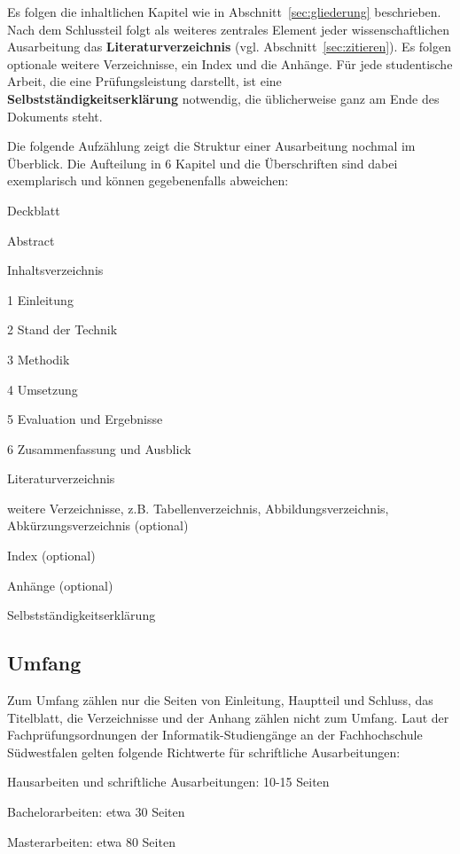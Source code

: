 Es folgen die inhaltlichen Kapitel wie in Abschnitt~\ref{sec:gliederung} beschrieben.
Nach dem Schlussteil folgt als weiteres zentrales Element jeder wissenschaftlichen Ausarbeitung das \textbf{Literaturverzeichnis} (vgl. Abschnitt~\ref{sec:zitieren}).
Es folgen optionale weitere Verzeichnisse, ein Index und die Anhänge.
Für jede studentische Arbeit, die eine Prüfungsleistung darstellt, ist eine \textbf{Selbstständigkeitserklärung} notwendig, die üblicherweise ganz am Ende des Dokuments steht.

Die folgende Aufzählung zeigt die Struktur einer Ausarbeitung nochmal im Überblick.
Die Aufteilung in 6 Kapitel und die Überschriften sind dabei exemplarisch und können gegebenenfalls abweichen:
\begin{compactitem}
\item Deckblatt
\item Abstract
\item Inhaltsverzeichnis
\item[1] Einleitung
\item[2] Stand der Technik
\item[3] Methodik
\item[4] Umsetzung
\item[5] Evaluation und Ergebnisse
\item[6] Zusammenfassung und Ausblick
\item Literaturverzeichnis
\item weitere Verzeichnisse, z.B. Tabellenverzeichnis, Abbildungsverzeichnis, Abkürzungsverzeichnis (optional)
\item Index (optional)
\item Anhänge (optional)
\item Selbstständigkeitserklärung
\end{compactitem}


\subsection{Umfang}

Zum Umfang zählen nur die Seiten von Einleitung, Hauptteil und Schluss, das Titelblatt, die Verzeichnisse und der Anhang zählen nicht zum Umfang.
Laut der Fachprüfungsordnungen der Informatik-Studiengänge an der Fachhochschule Südwestfalen gelten folgende Richtwerte für schriftliche Ausarbeitungen:
\begin{compactitem}
\item Hausarbeiten und schriftliche Ausarbeitungen: 10-15 Seiten
\item Bachelorarbeiten: etwa 30 Seiten
\item Masterarbeiten: etwa 80 Seiten 
\end{compactitem}

